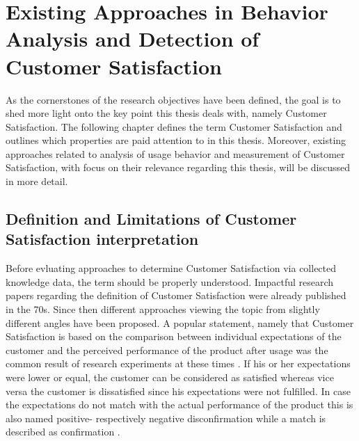 \chapter{Existing Approaches in Behavior Analysis and Detection of Customer Satisfaction}
\label{ch:backgroundResearch}
As the cornerstones of the research objectives have been defined, the goal is to shed more light onto the key point this thesis deals with, namely Customer Satisfaction. The following chapter defines the term Customer Satisfaction and outlines which properties are paid attention to in this thesis. Moreover, existing approaches related to analysis of usage behavior and measurement of Customer Satisfaction, with focus on their relevance regarding this thesis, will be discussed in more detail.

\section{Definition and Limitations of Customer Satisfaction interpretation}
\label{sec:custSatisfactionDefinition}
Before evluating approaches to determine Customer Satisfaction via collected knowledge data, the term should be properly understood. Impactful research papers regarding the definition of Customer Satisfaction were already published in the 70s. Since then different approaches viewing the topic from slightly different angles have been proposed. A popular statement, namely that Customer Satisfaction is based on the comparison between individual expectations of the customer and the perceived performance of the product after usage was the common result of research experiments at these times \cite{oliver1977effect} \cite{anderson1973consumer}. If his or her expectations were lower or equal, the customer can be considered as satisfied whereas vice versa the customer is dissatisfied since his expectations were not fulfilled. In case the expectations do not match with the actual performance of the product this is also named positive- respectively negative disconfirmation while a match is described as confirmation \cite{oliver1977effect} \cite{anderson1973consumer}.

